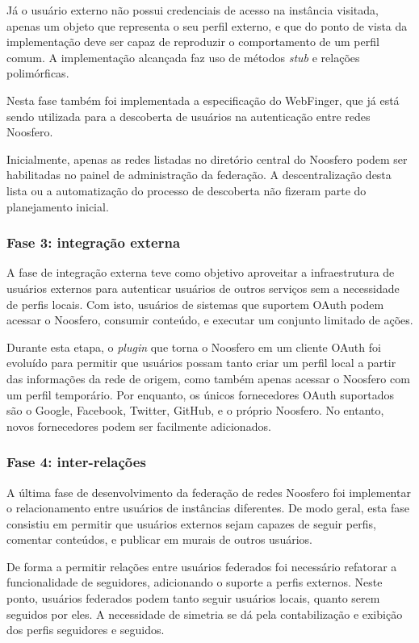 Já o usuário externo não possui credenciais de acesso na instância visitada, apenas
um objeto que representa o seu perfil externo, e que do ponto de vista da
implementação deve ser capaz de reproduzir o comportamento de um perfil comum. A
implementação alcançada faz uso de métodos \textit{stub} e relações polimórficas.

Nesta fase também foi implementada a especificação do WebFinger, que já está sendo
utilizada para a descoberta de usuários na autenticação entre redes Noosfero.

Inicialmente, apenas as redes listadas no diretório central do Noosfero podem ser
habilitadas no painel de administração da federação. A descentralização desta lista
ou a automatização do processo de descoberta não fizeram parte do planejamento
inicial.

\subsubsection{Fase 3: integração externa}

A fase de integração externa teve como objetivo aproveitar a infraestrutura de
usuários externos para autenticar usuários de outros serviços sem a necessidade de
perfis locais. Com isto, usuários de sistemas que suportem OAuth podem acessar o
Noosfero, consumir conteúdo, e executar um conjunto limitado de ações.

Durante esta etapa, o \textit{plugin} que torna o Noosfero em um cliente OAuth foi
evoluído para permitir que usuários possam tanto criar um perfil local a partir das
informações da rede de origem, como também apenas acessar o Noosfero com um perfil
temporário. Por enquanto, os únicos fornecedores OAuth suportados são o Google,
Facebook, Twitter, GitHub, e o próprio Noosfero. No entanto, novos fornecedores
podem ser facilmente adicionados.

\subsubsection{Fase 4: inter-relações}

A última fase de desenvolvimento da federação de redes Noosfero foi implementar o
relacionamento entre usuários de instâncias diferentes. De modo geral, esta fase
consistiu em permitir que usuários externos sejam capazes de seguir perfis, comentar
conteúdos, e publicar em murais de outros usuários.

De forma a permitir relações entre usuários federados foi necessário refatorar a
funcionalidade de seguidores, adicionando o suporte a perfis externos. Neste ponto,
usuários federados podem tanto seguir usuários locais, quanto serem seguidos por
eles. A necessidade de simetria se dá pela contabilização e exibição dos perfis
seguidores e seguidos.

